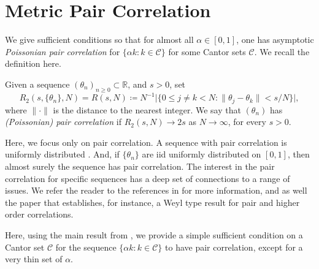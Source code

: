 




\section{Metric Pair Correlation}  
\label{sec;PairCorrelation}

We give sufficient conditions so that for almost all $\alpha \in [0,1]$, one has asymptotic \emph{Poissonian pair correlation} for 
$\{ \alpha k \colon k\in \mathcal{C}\}$
 for some Cantor sets $\mathcal C$.   
We recall the definition here. 

\begin{definition}  Given a sequence $(\theta_n)_{n\geq 0} \subset \mathbb R$, and $s>0$, set  
\begin{equation}
    R_2 (s,\{\theta_n \}, N) = R(s,N)
    \coloneqq 
    N^{-1} \lvert \{ 0\leq j\neq k < N \colon 
    \lVert \theta_j - \theta_k \rVert < s/N\}\rvert , 
\end{equation}
where $\lVert \cdot \rVert$ is the distance to the nearest integer. 
We say that $(\theta_n)$ has \emph{(Poissonian) pair correlation} if $R_2(s,N) \to 2s$ as $N\to \infty$, 
for every $s>0$.  
\end{definition}

Here, we focus only on pair correlation.  
A sequence with pair correlation is uniformly distributed \cites{AistleitnerLachmannPausinger2018,GrepstadLarcher2017}. And, if $\{\theta_n\}$ are iid uniformly distributed on $[0,1]$, then almost surely the sequence has pair correlation. The interest in the pair correlation for specific sequences has a deep set of connections to a range of issues.
We refer the reader to the references in \cites{MR3736514,MR4634690} for more information, and as well the paper \cite{MR4542733} that establishes, for instance,  a Weyl type result for pair and higher order correlations. 


Here, using the main result from \cite{MR3736514}, we  provide a simple sufficient condition 
on a Cantor set $\mathcal C$  for the sequence 
$\{ \alpha k \colon k\in \mathcal{C}\}$
 to have pair correlation, except for a very thin set of $\alpha$. 


